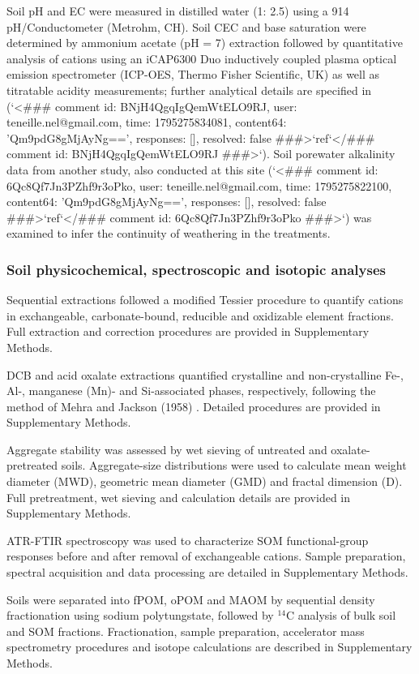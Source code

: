 \documentclass[preprint,12pt]{elsarticle}
\begin{document}
Soil pH and EC were measured in distilled water (1: 2.5) using a 914 pH/Conductometer (Metrohm, CH). Soil CEC and base saturation were determined by ammonium acetate (pH = 7) extraction followed by quantitative analysis of cations using an iCAP6300 Duo inductively coupled plasma optical emission spectrometer (ICP-OES, Thermo Fisher Scientific, UK) as well as titratable acidity measurements; further analytical details are specified in (`<### comment id: BNjH4QgqIgQemWtELO9RJ, user: teneille.nel@gmail.com, time: 1795275834081, content64: 'Qm9pdG8gMjAyNg==', responses: [], resolved: false ###>`ref`</### comment id: BNjH4QgqIgQemWtELO9RJ ###>`). Soil porewater alkalinity data from another study, also conducted at this site (`<### comment id: 6Qc8Qf7Jn3PZhf9r3oPko, user: teneille.nel@gmail.com, time: 1795275822100, content64: 'Qm9pdG8gMjAyNg==', responses: [], resolved: false ###>`ref`</### comment id: 6Qc8Qf7Jn3PZhf9r3oPko ###>`) was examined to infer the continuity of weathering in the treatments. 

\subsubsection{Soil physicochemical, spectroscopic and isotopic analyses}
Sequential extractions followed a modified Tessier procedure \citep{Tessier1979} to quantify cations in exchangeable, carbonate-bound, reducible and oxidizable element fractions. Full extraction and correction procedures are provided in Supplementary Methods.

DCB and acid oxalate extractions quantified crystalline and non-crystalline Fe-, Al-, manganese (Mn)- and Si-associated phases, respectively, following the method of Mehra and Jackson (1958) \citep{Mehra1958}. Detailed procedures are provided in Supplementary Methods.

Aggregate stability was assessed by wet sieving of untreated and oxalate-pretreated soils. Aggregate-size distributions were used to calculate mean weight diameter (MWD), geometric mean diameter (GMD) and fractal dimension (D). Full pretreatment, wet sieving and calculation details are provided in Supplementary Methods.

ATR-FTIR spectroscopy was used to characterize SOM functional-group responses before and after removal of exchangeable cations. Sample preparation, spectral acquisition and data processing are detailed in Supplementary Methods.

Soils were separated into fPOM, oPOM and MAOM by sequential density fractionation using sodium polytungstate, followed by $^{14}$C analysis of bulk soil and SOM fractions. Fractionation, sample preparation, accelerator mass spectrometry procedures and isotope calculations are described in Supplementary Methods.
\end{document}
